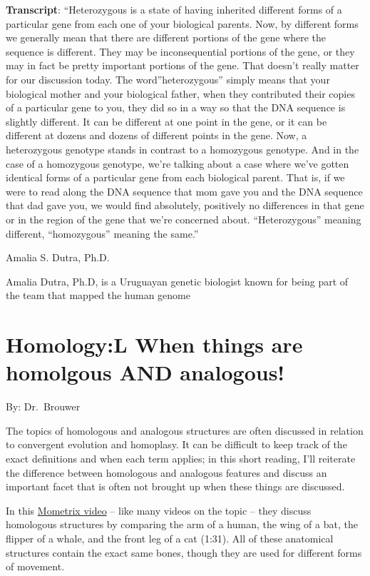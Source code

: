 \documentclass[
]{book}
\begin{document}
\textbf{Transcript}: ``Heterozygous is a state of having inherited different forms of a particular gene from each one of your biological parents. Now, by different forms we generally mean that there are different portions of the gene where the sequence is different. They may be inconsequential portions of the gene, or they may in fact be pretty important portions of the gene. That doesn't really matter for our discussion today. The word''heterozygous'' simply means that your biological mother and your biological father, when they contributed their copies of a particular gene to you, they did so in a way so that the DNA sequence is slightly different. It can be different at one point in the gene, or it can be different at dozens and dozens of different points in the gene. Now, a heterozygous genotype stands in contrast to a homozygous genotype. And in the case of a homozygous genotype, we're talking about a case where we've gotten identical forms of a particular gene from each biological parent. That is, if we were to read along the DNA sequence that mom gave you and the DNA sequence that dad gave you, we would find absolutely, positively no differences in that gene or in the region of the gene that we're concerned about. ``Heterozygous'' meaning different, ``homozygous'' meaning the same.''

Amalia S. Dutra, Ph.D.

Amalia Dutra, Ph.D, is a Uruguayan genetic biologist known for being part of the team that mapped the human genome

\hypertarget{homologyl-when-things-are-homolgous-and-analogous}{%
\section{Homology:L When things are homolgous AND analogous!}\label{homologyl-when-things-are-homolgous-and-analogous}}

By: Dr.~Brouwer

The topics of homologous and analogous structures are often discussed in relation to convergent evolution and homoplasy. It can be difficult to keep track of the exact definitions and when each term applies; in this short reading, I'll reiterate the difference between homologous and analogous features and discuss an important facet that is often not brought up when these things are discussed.

In this \href{https://www.youtube.com/watch?v=xQmb6B8c_TI}{Mometrix video} -- like many videos on the topic -- they discuss homologous structures by comparing the arm of a human, the wing of a bat, the flipper of a whale, and the front leg of a cat (1:31). All of these anatomical structures contain the exact same bones, though they are used for different forms of movement.
\end{document}
